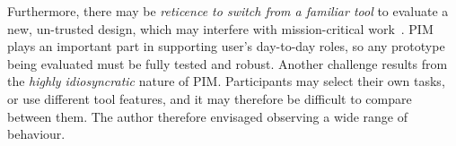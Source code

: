 Furthermore,  there may be \textit{reticence to switch from a familiar tool} to evaluate a new, un-trusted design, which may interfere with mission-critical work~\citep{Bellotti:03}. PIM plays an important part in supporting user's day-to-day roles, so any prototype being evaluated must be fully tested and robust.
Another challenge results from the \textit{highly idiosyncratic} nature of PIM.  Participants may select their own tasks, or use different tool features, and it may therefore be difficult to compare between them.  The author therefore envisaged observing a wide range of behaviour.



